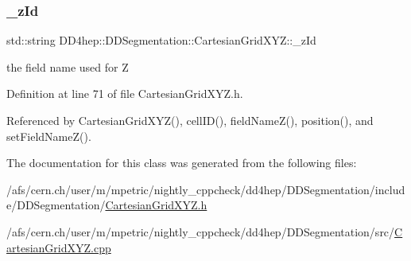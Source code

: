 \subsubsection{\texorpdfstring{\+\_\+z\+Id}{\_zId}}
{\footnotesize\ttfamily std\+::string D\+D4hep\+::\+D\+D\+Segmentation\+::\+Cartesian\+Grid\+X\+Y\+Z\+::\+\_\+z\+Id\hspace{0.3cm}{\ttfamily [protected]}}



the field name used for Z 



Definition at line 71 of file Cartesian\+Grid\+X\+Y\+Z.\+h.



Referenced by Cartesian\+Grid\+X\+Y\+Z(), cell\+I\+D(), field\+Name\+Z(), position(), and set\+Field\+Name\+Z().



The documentation for this class was generated from the following files\+:\begin{DoxyCompactItemize}
\item 
/afs/cern.\+ch/user/m/mpetric/nightly\+\_\+cppcheck/dd4hep/\+D\+D\+Segmentation/include/\+D\+D\+Segmentation/\hyperlink{_d_d_segmentation_2include_2_d_d_segmentation_2_cartesian_grid_x_y_z_8h}{Cartesian\+Grid\+X\+Y\+Z.\+h}\item 
/afs/cern.\+ch/user/m/mpetric/nightly\+\_\+cppcheck/dd4hep/\+D\+D\+Segmentation/src/\hyperlink{_d_d_segmentation_2src_2_cartesian_grid_x_y_z_8cpp}{Cartesian\+Grid\+X\+Y\+Z.\+cpp}\end{DoxyCompactItemize}
